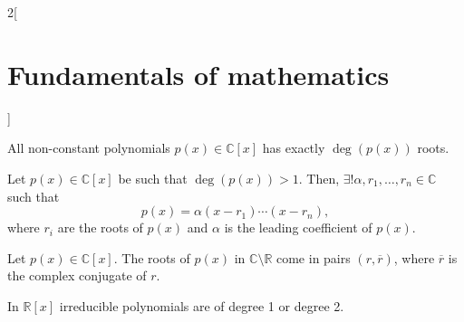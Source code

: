 \documentclass[../../../main.tex]{subfiles}
\begin{document}
\begin{multicols}{2}[\section{Fundamentals of mathematics}]
\begin{theorem}
  \end{theorem}
  \begin{theorem}
    All non-constant polynomials $p(x)\in\mathbb{C}[x]$ has exactly $\deg(p(x))$ roots.
  \end{theorem}
  \begin{corollary}
    Let $p(x)\in\mathbb{C}[x]$ be such that $\deg(p(x))>1$. Then, $\exists!\alpha,r_1,\ldots,r_n\in\mathbb{C}$ such that $$p(x)=\alpha(x-r_1)\cdots(x-r_n),$$ where $r_i$ are the roots of $p(x)$ and $\alpha$ is the leading coefficient of $p(x)$.
  \end{corollary}
  \begin{corollary}
    Let $p(x)\in\mathbb{C}[x]$. The roots of $p(x)$ in $\mathbb{C}\setminus\mathbb{R}$ come in pairs $(r,\overline{r})$, where $\overline{r}$ is the complex conjugate of $r$.
  \end{corollary}
  \begin{theorem}
    In $\mathbb{R}[x]$ irreducible polynomials are of degree 1 or degree 2.
  \end{theorem}
\end{multicols}
\end{document}
